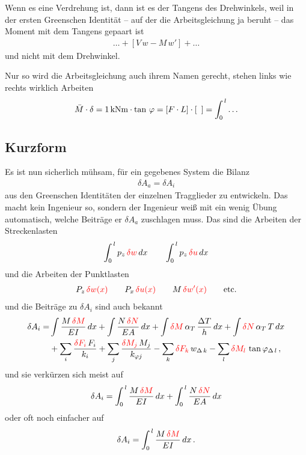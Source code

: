 {{{{Wenn es eine Verdrehung ist, dann ist es der Tangens des Drehwinkels, weil in der ersten Greenschen Identit\"{a}t -- auf der die Arbeitsgleichung ja beruht -- das Moment mit dem Tangens gepaart ist
\begin{align}
\ldots + [V\,w - M\,w'] + \ldots
\end{align}
und nicht mit dem Drehwinkel.

Nur so wird die Arbeitsgleichung auch ihrem Namen gerecht, stehen links wie rechts wirklich Arbeiten
\begin{align}
\bar{M} \cdot  \delta = 1 \,\text{kNm}\cdot \tan\,\varphi = [F \cdot L] \cdot [\,\,\,  ] = \int_0^{\,l} \ldots
\end{align}

{\textcolor{sectionTitleBlue}{\section{Kurzform}}}
Es ist nun sicherlich m\"{u}hsam, f\"{u}r ein gegebenes System die Bilanz
\begin{align}
\delta A_a = \delta A_i
\end{align}
aus den Greenschen Identit\"{a}ten der einzelnen Tragglieder zu entwickeln. Das macht kein Ingenieur so, sondern der Ingenieur wei{\ss} mit ein wenig \"{U}bung automatisch, welche Beitr\"{a}ge er $\delta A_a$ zuschlagen muss. Das sind die Arbeiten der Streckenlasten
\begin{align}
\int_0^{\,l} p_z\,\textcolor{red}{\delta w}\,dx \qquad \int_0^{\,l} p_z\,\textcolor{red}{\delta u}\,dx
\end{align}
und die Arbeiten der Punktlasten
\begin{align}
P_z\,\textcolor{red}{\delta w(x)}  \qquad P_x\,\textcolor{red}{\delta u(x)} \qquad M\,\textcolor{red}{\delta w'(x)} \qquad \text{etc.}
\end{align}
und die Beitr\"{a}ge zu $\delta A_i$ sind auch bekannt
  \begin{align}
   \delta A_i = &
    \int \frac{M\,\textcolor{red}{\delta M}}{EI}\,dx  + \int \frac{N\,\textcolor{red}{\delta N}}{EA}\,dx
    +  \int \textcolor{red}{\delta M}\,\alpha_T\,\frac{\Delta T}{h}\,dx + \int \textcolor{red}{\delta N}\,\alpha_T\,T\,dx \nonumber \\
     &+ \sum_i \frac{\textcolor{red}{\delta F_i}\,F_i}{k_{i}}
    + \sum_j \frac{\textcolor{red}{\delta M_j}\,M_j}{k_{\varphi j}} - \sum_k \textcolor{red}{\delta F_k}\,w_{\Delta\,k}
    - \sum_l  \textcolor{red}{\delta M_l}\,\tan \varphi_{\Delta\,l}\,,
\end{align}
und sie verk\"{u}rzen sich meist auf
\begin{align}
\delta A_i = \int_0^{\,l} \frac{M\,\textcolor{red}{\delta M}}{EI}\,dx  + \int_0^{\,l} \frac{N\,\textcolor{red}{\delta N}}{EA}\,dx
\end{align}
oder oft noch einfacher auf
\begin{align}
\delta A_i = \int_0^{\,l} \frac{M\,\textcolor{red}{\delta M}}{EI}\,dx\,.
\end{align}

}}}}
